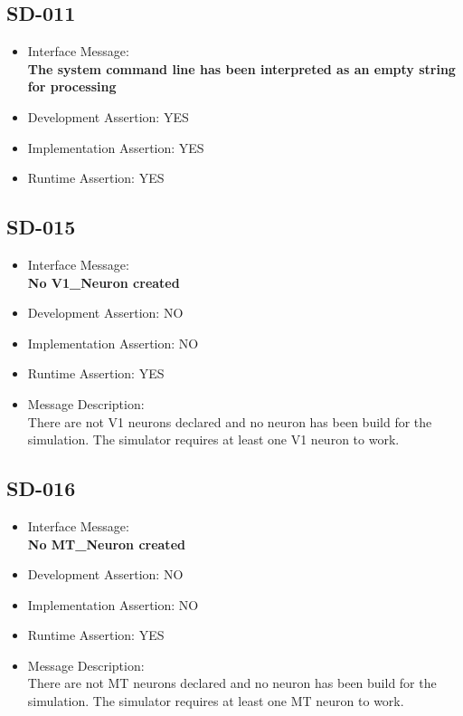 \subsection{SD-011}
\begin{itemize}
  \item Interface Message:\\[1em]
    \textbf{The system command line has been interpreted as an empty string for processing}
  \item Development Assertion: YES
  \item Implementation Assertion: YES
  \item Runtime Assertion: YES
\end{itemize}

\subsection{SD-015}
\begin{itemize}
  \item Interface Message:\\[1em]
    \textbf{No V1\_Neuron created}
  \item Development Assertion: NO
  \item Implementation Assertion: NO
  \item Runtime Assertion: YES
  \item Message Description:\\[1em]
    There are not V1 neurons declared and no neuron has been build for the simulation. The simulator requires at least one V1 neuron to work.
\end{itemize}

\subsection{SD-016}
\begin{itemize}
  \item Interface Message:\\[1em]
    \textbf{No MT\_Neuron created}
  \item Development Assertion: NO
  \item Implementation Assertion: NO
  \item Runtime Assertion: YES
  \item Message Description:\\[1em]
    There are not MT neurons declared and no neuron has been build for the simulation. The simulator requires at least one MT neuron to work.
\end{itemize}

